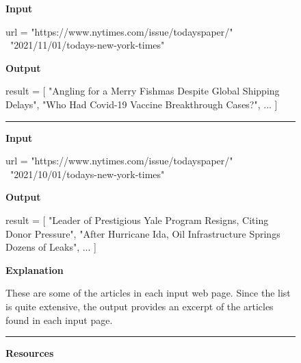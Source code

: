 \begin{figure}
\begin{mdframed}[backgroundcolor=gray!05] 
\begin{scriptsize}



\textbf{Input} 


\begin{python}
url = "https://www.nytimes.com/issue/todayspaper/" \
  "2021/11/01/todays-new-york-times"
\end{python}

\textbf{Output}


\begin{python}
result = [ 
  "Angling for a Merry Fishmas Despite Global Shipping Delays",
  "Who Had Covid-19 Vaccine Breakthrough Cases?",
  ... ]
\end{python}



\begin{center}
\rule{10cm}{0.4pt}
\end{center}



\textbf{Input}

\begin{python}
url = "https://www.nytimes.com/issue/todayspaper/" \
  "2021/10/01/todays-new-york-times"
\end{python}

\textbf{Output}


\begin{python}
result = [ 
  "Leader of Prestigious Yale Program Resigns, Citing Donor Pressure",
  "After Hurricane Ida, Oil Infrastructure Springs Dozens of Leaks",
  ... ]
\end{python}


\textbf{Explanation} \medskip


These are some of the articles in each input web page. Since the list is quite extensive, the output provides an excerpt of the articles found in each input page. 



\begin{center}
\rule{10cm}{0.4pt}
\end{center}
  


\textbf{Resources}


\end{scriptsize}
\end{mdframed}
\end{figure}
